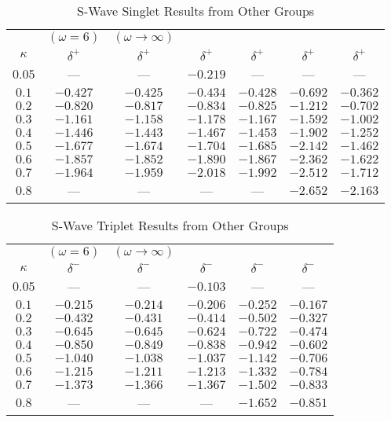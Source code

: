 \documentclass[Dissertation.tex]{subfiles}
\begin{document}
\begin{table}[H]
\centering
\begin{tabular}{c c c c c c c}
\toprule
 & $(\omega = 6)$ & $(\omega \rightarrow \infty)$ &  &  &  & \\
$\kappa$ & $\delta^+$ \cite{VanReeth2003} & $\delta^+$ \cite{VanReeth2003} & $\delta^+$ \cite{Blackwood2002} & $\delta^+$ \cite{Walters2004} & $\delta^+$ \cite{Ray1997} & $\delta^+$ \cite{Adhikari1999} \\
\midrule
$0.05$ & --- & --- & $-0.219$ & --- & --- & --- \\
$0.1$ & $-0.427$ & $-0.425$ & $-0.434$ & $-0.428$ & $-0.692$ & $-0.362$ \\
$0.2$ & $-0.820$ & $-0.817$ & $-0.834$ & $-0.825$ & $-1.212$ & $-0.702$ \\
$0.3$ & $-1.161$ & $-1.158$ & $-1.178$ & $-1.167$ & $-1.592$ & $-1.002$ \\
$0.4$ & $-1.446$ & $-1.443$ & $-1.467$ & $-1.453$ & $-1.902$ & $-1.252$ \\
$0.5$ & $-1.677$ & $-1.674$ & $-1.704$ & $-1.685$ & $-2.142$ & $-1.462$ \\
$0.6$ & $-1.857$ & $-1.852$ & $-1.890$ & $-1.867$ & $-2.362$ & $-1.622$ \\
$0.7$ & $-1.964$ & $-1.959$ & $-2.018$ & $-1.992$ & $-2.512$ & $-1.712$ \\
$0.8$ &    --- &    --- &    --- &    --- & $-2.652$ & $-2.163$ \\
\bottomrule
\end{tabular}
\caption{S-Wave Singlet Results from Other Groups}
\label{tab:SWaveSingletOther}
\end{table}


\begin{table}[H]
\centering
\begin{tabular}{c c c c c c}
\toprule
 & $(\omega = 6)$ & $(\omega \rightarrow \infty)$ &  &  &   \\
$\kappa$ & $\delta^-$ \cite{VanReeth2003} & $\delta^-$ \cite{VanReeth2003} & $\delta^-$ \cite{Blackwood2002} & $\delta^-$ \cite{Ray1997} & $\delta^-$ \cite{Adhikari1999} \\
\midrule
$0.05$ & --- & --- & $-0.103$ & --- & --- \\
$0.1$ & $-0.215$ & $-0.214$ & $-0.206$ & $-0.252$ & $-0.167$ \\
$0.2$ & $-0.432$ & $-0.431$ & $-0.414$ & $-0.502$ & $-0.327$ \\
$0.3$ & $-0.645$ & $-0.645$ & $-0.624$ & $-0.722$ & $-0.474$ \\
$0.4$ & $-0.850$ & $-0.849$ & $-0.838$ & $-0.942$ & $-0.602$ \\
$0.5$ & $-1.040$ & $-1.038$ & $-1.037$ & $-1.142$ & $-0.706$ \\
$0.6$ & $-1.215$ & $-1.211$ & $-1.213$ & $-1.332$ & $-0.784$ \\
$0.7$ & $-1.373$ & $-1.366$ & $-1.367$ & $-1.502$ & $-0.833$ \\
$0.8$ &    --- &    --- &    --- & $-1.652$ & $-0.851$ \\
\bottomrule
\end{tabular}
\caption{S-Wave Triplet Results from Other Groups}
\label{tab:SWaveTripletOther}
\end{table}
\end{document}
